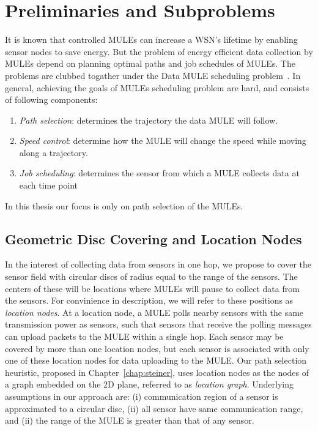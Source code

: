 \chapter{Preliminaries and Subproblems}
\label{chapter:2}


It is known that controlled MULEs can increase a WSN's lifetime by enabling sensor nodes to save energy. But the problem of energy efficient data collection by MULEs depend on planning optimal paths and job schedules of MULEs. The problems are clubbed togather under the Data MULE scheduling problem~\cite{dms}. In general, achieving the goals of MULEs scheduling problem are 
hard, and consists of following components: 
\begin{enumerate}
  \item {\em Path selection}: determines the trajectory the data MULE 
    will follow.
\item {\em Speed control}: determine how the MULE will change the speed
  while moving along a trajectory. 
\item {\em Job scheduling}: determines the sensor from which a MULE collects data at each time point
\end{enumerate}
In this thesis our focus is only on path selection of the MULEs.

\section{Geometric Disc Covering and Location Nodes}

In the interest of collecting data from sensors in one hop, we propose to cover the sensor field with circular discs of radius equal to the range of the sensors. The centers of these will be locations where MULEs will pause to collect data from the sensors. For convinience in description, we will refer to these positions as \emph{location nodes}. At a location node, a MULE polls nearby sensors with the same transmission power as sensors, such that sensors that receive the polling messages can upload packets to the MULE within a single hop. Each sensor may be covered by more than one location nodes, but each sensor is associated with only one of these location nodes for data uploading to the MULE. Our path selection heuristic, proposed in Chapter~\ref{chap:steiner}, uses location nodes as the nodes of a graph embedded on the 2D plane, referred to as \emph{location graph}. Underlying assumptions in our approach are: (i) communication region of a sensor is approximated to a circular disc, (ii) all sensor have same communication range, and (ii) the range of the MULE is greater than that of any sensor. %

